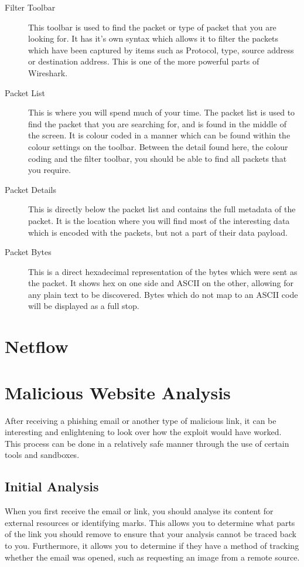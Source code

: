 			\begin{description}
				\item[Filter Toolbar] This toolbar is used to find the packet or type of packet that you are looking for.
					It has it's own syntax which allows it to filter the packets which have been captured by items such as
					Protocol, type, source address or destination address.
					This is one of the more powerful parts of Wireshark.
				\item[Packet List] This is where you will spend much of your time.
					The packet list is used to find the packet that you are searching for, and is found in the middle of the screen.
					It is colour coded in a manner which can be found within the colour settings on the toolbar.
					Between the detail found here, the colour coding and the filter toolbar, you should be able to find all packets that you require.
				\item[Packet Details]
					This is directly below the packet list and contains the full metadata of the packet.
					It is the location where you will find most of the interesting data which is encoded with the packets, but not a part of their data payload.
				\item[Packet Bytes]
					This is a direct hexadecimal representation of the bytes which were sent as the packet.
					It shows hex on one side and ASCII on the other, allowing for any plain text to be discovered.
					Bytes which do not map to an ASCII code will be displayed as a full stop.
			\end{description}

	\section{Netflow}
	\section{Malicious Website Analysis}
		After receiving a phishing email or another type of malicious link, it can be interesting and enlightening to look over how the exploit would have worked.
		This process can be done in a relatively safe manner through the use of certain tools and sandboxes.

		\subsection{Initial Analysis}
			When you first receive the email or link, you should analyse its content for external resources or identifying marks.
			This allows you to determine what parts of the link you should remove to ensure that your analysis cannot be traced back to you.
			Furthermore, it allows you to determine if they have a method of tracking whether the email was opened, such as requesting an image from a remote source.

